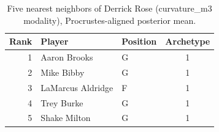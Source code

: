 \begin{table}[htbp]
  \centering\small
  \begin{tabular}{rllc}
    \toprule
    Rank & Player & Position & Archetype \\
    \midrule
    1 & Aaron Brooks & G & 1 \\
    2 & Mike Bibby & G & 1 \\
    3 & LaMarcus Aldridge & F & 1 \\
    4 & Trey Burke & G & 1 \\
    5 & Shake Milton & G & 1 \\
    \bottomrule
  \end{tabular}
  \caption{Five nearest neighbors of Derrick Rose (curvature_m3 modality), Procrustes-aligned posterior mean.}
  \label{tab:Derrick_Rose_neighbors_curvature_m3}
\end{table}

